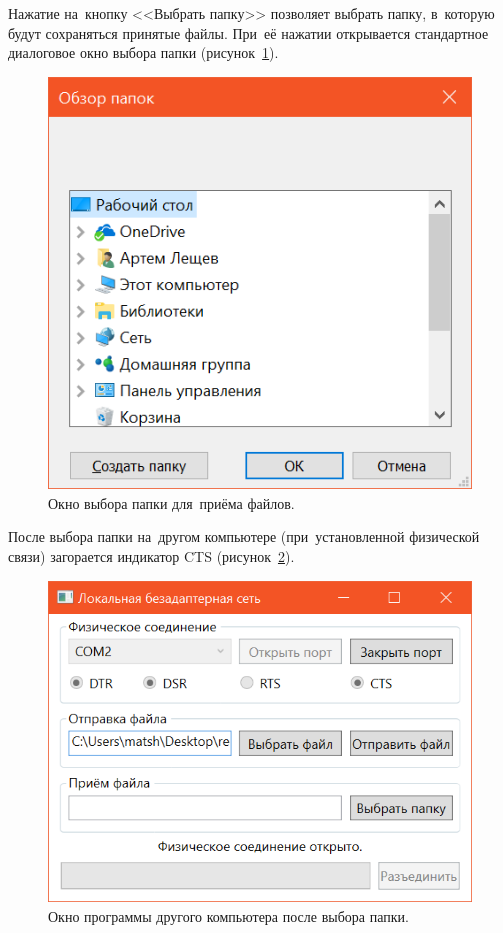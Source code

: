 \documentclass[a4paper,12pt]{article}
\begin{document}
Нажатие на~кнопку <<Выбрать папку>> позволяет выбрать папку, в~которую будут сохраняться принятые файлы. При~её нажатии открывается стандартное диалоговое окно выбора папки (рисунок~\ref{folder}).
\begin{figure}
\centering
\includegraphics{folder.png}
\caption{Окно выбора папки для~приёма файлов.}\label{folder}
\end{figure}
После выбора папки на~другом компьютере (при~установленной физической связи) загорается индикатор CTS (рисунок~\ref{cts}).
\begin{figure}[!h]
\centering
\includegraphics{cts.png}
\caption{Окно программы другого компьютера после выбора папки.}\label{cts}
\end{figure}
\end{document}
